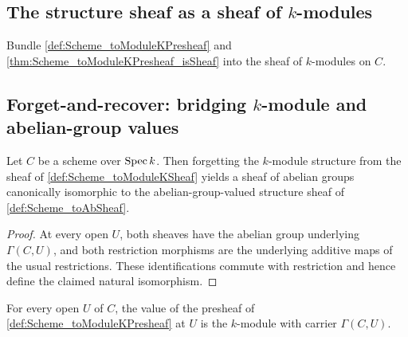 \subsection{The structure sheaf as a sheaf of \(k\)-modules}

\begin{definition}\leanok
  \label{def:Scheme_toModuleKSheaf}

  Bundle \cref{def:Scheme_toModuleKPresheaf} and \cref{thm:Scheme_toModuleKPresheaf_isSheaf} into the sheaf of \(k\)-modules on \(C\).
\end{definition}

\subsection{Forget-and-recover: bridging \(k\)-module and abelian-group values}

\begin{definition}\leanok
  \label{def:Scheme_toModuleKSheaf_forgetCompare}

  Let \(C\) be a scheme over \(\operatorname{Spec} k\). Then forgetting the \(k\)-module structure from the sheaf of \cref{def:Scheme_toModuleKSheaf} yields a sheaf of abelian groups canonically isomorphic to the abelian-group-valued structure sheaf of \cref{def:Scheme_toAbSheaf}.
\end{definition}

\begin{proof}
  
  \leanok
  At every open \(U\), both sheaves have the abelian group underlying \(\Gamma(C,U)\), and both restriction morphisms are the underlying additive maps of the usual restrictions. These identifications commute with restriction and hence define the claimed natural isomorphism.
\end{proof}

\begin{lemma}\leanok
  \label{lem:Scheme_toModuleKPresheaf_obj}

  For every open \(U\) of \(C\), the value of the presheaf of \cref{def:Scheme_toModuleKPresheaf} at \(U\) is the \(k\)-module with carrier \(\Gamma(C, U)\).
\end{lemma}


